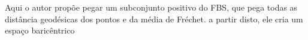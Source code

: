 \documentclass[a4paper,titlepage]{article}
\begin{document}
{
\vspace{1em}
\vspace{1em}
}
Aqui o autor propõe pegar um subconjunto positivo do FBS, que pega todas as distância geodésicas dos pontos e da média de Fréchet. a partir disto, ele cria um espaço baricêntrico 
{
\vspace{1em}
\vspace{1em}
}
{
\vspace{1em}
\vspace{1em}
}
\end{document}
